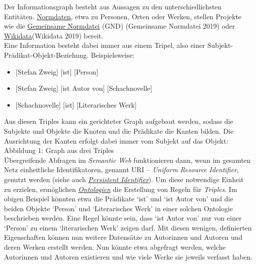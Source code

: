 \documentclass{article}
\begin{document}
        Der Informationsgraph besteht aus Aussagen zu den unterschiedlichsten Entitäten.
                     \href{http://gams.uni-graz.at/o:konde.147}{Normdaten}, etwa zu Personen,
                  Orten oder Werken, stellen Projekte wie die \href{http://gams.uni-graz.at/o:konde.109}{Gemeinsame Normdatei} (GND) (Gemeinsame
                     Normdatei 2019) oder \href{http://gams.uni-graz.at/o:konde.112}{Wikidata}(Wikidata 2019) bereit.\\
            
        Eine Information besteht dabei immer aus einem Tripel, also einer
                  Subjekt-Prädikat-Objekt-Beziehung. Beispielsweise:\\
            
        \begin{itemize}\item {[Stefan Zweig] [ist] [Person]}\item {[Stefan Zweig] [ist Autor von] [Schachnovelle]}\item {[Schachnovelle] [ist] [Literarisches Werk]}\end{itemize}Aus diesen Triples kann ein gerichteter Graph aufgebaut werden, sodass die
                  Subjekte und Objekte die Knoten und die Prädikate die Kanten bilden. Die
                  Ausrichtung der Kanten erfolgt dabei immer vom Subjekt auf das Objekt:\\
            
        Abbildung 1: Graph aus drei Triples\\
            
        Übergreifende Abfragen im \emph{Semantic Web} funktionieren dann,
                  wenn im gesamten Netz einheitliche Identifikatoren, genannt URI\emph{
                     – Uniform Resource Identifier}, genutzt werden (siehe auch \emph{\href{http://gams.uni-graz.at/o:konde.12}{Persistent Identifier}}). Um diese notwendige Einheit zu erzielen, ermöglichen \emph{\href{http://gams.uni-graz.at/o:konde.151}{Ontologien}} die Erstellung von Regeln für \emph{Triples}. Im obigen
                  Beispiel könnten etwa die Prädikate ‘ist’ und ‘ist Autor von’ und die beiden
                  Objekte ‘Person’ und ‘Literarisches Werk’ in einer solchen Ontologie beschrieben
                  werden. Eine Regel könnte sein, dass ‘ist Autor von’ nur von einer ‘Person’ zu
                  einem ‘literarischen Werk’ zeigen darf. Mit diesen wenigen, definierten
                  Eigenschaften können nun weitere Datensätze zu Autorinnen und Autoren und deren
                  Werken erstellt werden. Nun könnte etwa abgefragt werden, welche Autorinnen und
                  Autoren existieren und wie viele Werke sie jeweils verfasst haben.\\
            
\end{document}
